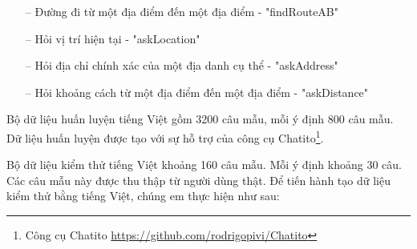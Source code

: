 \begin{itemize}
    \item[--] Đường đi từ một địa điểm đến một địa điểm - "findRouteAB"
    \item[--] Hỏi vị trí hiện tại - "askLocation"
    \item[--] Hỏi địa chỉ chính xác của một địa danh cụ thể - "askAddress"
    \item[--] Hỏi khoảng cách từ một địa điểm đến một địa điểm - "askDistance"
\end{itemize}

Bộ dữ liệu huấn luyện tiếng Việt gồm 3200 câu mẫu, mỗi ý định 800 câu mẫu. Dữ liệu huấn luyện được tạo với sự hỗ trợ của công cụ Chatito\footnote{Công cụ Chatito \url{https://github.com/rodrigopivi/Chatito}}.

Bộ dữ liệu kiểm thử tiếng Việt khoảng 160 câu mẫu. Mỗi ý định khoảng 30 câu. Các câu mẫu này được thu thập từ người dùng thật. Để tiến hành tạo dữ liệu kiểm thử bằng tiếng Việt, chúng em thực hiện như sau:

